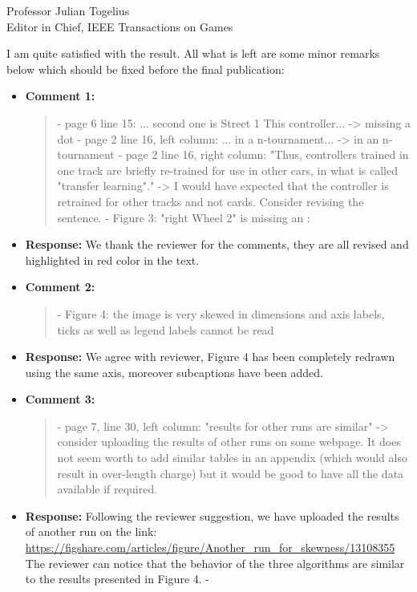\documentclass[10pt]{letter} %
\begin{document}
\begin{letter}{Professor Julian Togelius \\ Editor in Chief, IEEE Transactions on Games}
\begin{enumerate}
		I am quite satisfied with the result. All what is left are some minor remarks below which should be fixed before the final publication:
		
		\begin{itemize}
			\item {\bf Comment 1:}
				\begin{quote}
					- page 6 line 15: ... second one is Street 1 This controller... -> missing a dot
					- page 2 line 16, left column: ... in a n-tournament... -> in an n-tournament
					- page 2 line 16, right column: "Thus, controllers trained in one track are briefly re-trained for use in other cars, in what is called "transfer learning"." -> I would have expected that the controller is retrained for other tracks and not cards. Consider revising the sentence.
					- Figure 3: "right Wheel 2" is missing an :
				\end{quote}	
			\item {\bf Response:} 
					We thank the reviewer for the comments, they are all revised and highlighted in red color in the text.
			\item {\bf Comment 2:}
				\begin{quote}
					- Figure 4: the image is very skewed in dimensions and axis labels, ticks as well as legend labels cannot be read
				\end{quote}	
			\item {\bf Response:} 
				We agree with reviewer, Figure 4 has been completely redrawn using the same axis, moreover subcaptions have been added. 
			\item {\bf Comment 3:}
				\begin{quote}
					- page 7, line 30, left column: "results for other runs are similar" -> consider uploading the results of other runs on some webpage. It does not seem worth to add similar tables in an appendix (which would also result in over-length charge) but it would be good to have all the data available if required.
				\end{quote}	
			\item {\bf Response:} 
				Following the reviewer suggestion, we have uploaded  the results of another run on the link:\\
			\url{	https://figshare.com/articles/figure/Another\_run\_for\_skewness/13108355}\\
			The reviewer can notice that the behavior of the three algorithms are similar to the results presented in Figure 4.
		-
	   \end{itemize}


\end{enumerate}
\end{letter}
\end{document}
